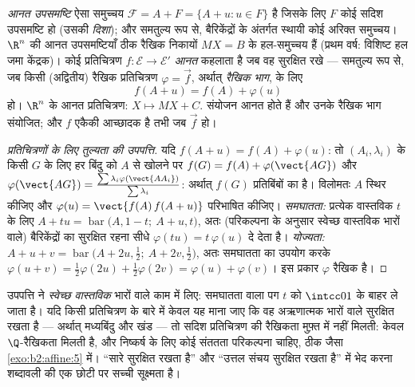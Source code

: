 \begin{definition}\label{def:b2:affine:subspace}
\emph{आनत उपसमष्टि} ऐसा समुच्चय $\mathcal{F} = A + F = \{A + u :
u \in F\}$ है जिसके लिए $F$ कोई सदिश उपसमष्टि हो
(उसकी \emph{दिशा}); और समतुल्य रूप से, बैरिकेंद्रों के अंतर्गत स्थायी कोई
अरिक्त समुच्चय। $\R^n$ की आनत उपसमष्टियाँ ठीक रैखिक निकायों $MX = B$ के हल-समुच्चय
हैं (प्रथम वर्ष: विशिष्ट हल जमा केंद्रक)। कोई प्रतिचित्रण $f \colon
\mathcal{E} \to \mathcal{E}'$
\emph{आनत} कहलाता है जब वह  सुरक्षित रखे
--- समतुल्य रूप से, जब किसी (अद्वितीय) रैखिक प्रतिचित्रण $\varphi = \vec f$, अर्थात्
\emph{रैखिक भाग}, के लिए
\[
f(A + u) = f(A) + \varphi(u)
\]
हो। $\R^n$ के आनत प्रतिचित्रण: $X \mapsto MX + C$. संयोजन आनत होते हैं और उनके रैखिक भाग
संयोजित; और $f$ एकैकी आच्छादक है तभी जब $\vec f$ हो।
\end{definition}

\begin{proof}[प्रतिचित्रणों के लिए तुल्यता की उपपत्ति]
यदि $f(A + u) = f(A) + \varphi(u)$: तो $(A_i,
\lambda_i)$ के किसी  $G$ के लिए हर बिंदु को $A$ से खोलने पर
$f(G) = f(A) +
\varphi(\vect{AG})$ और $\varphi(\vect{AG}) =
\frac{\sum\lambda_i\varphi(\vect{AA_i})}{\sum\lambda_i}$: अर्थात् $f(G)$ प्रतिबिंबों का  है। विलोमतः $A$ स्थिर
कीजिए और $\varphi(u) = \vect{f(A)\,f(A + u)}$ परिभाषित कीजिए। \emph{समघातता:} प्रत्येक वास्तविक $t$ के लिए
$A + tu =
\operatorname{bar}\bigl(A, 1-t;\ A + u, t\bigr)$, अतः (परिकल्पना के अनुसार स्वेच्छ वास्तविक भारों वाले) बैरिकेंद्रों का
सुरक्षित रहना सीधे $\varphi(tu) = t\,\varphi(u)$ दे देता है। \emph{योज्यता:} $A + u + v = \operatorname{bar}\bigl(A + 2u,
\tfrac12;\ A + 2v, \tfrac12\bigr)$, अतः समघातता का
उपयोग करके $\varphi(u + v) =
\tfrac12\varphi(2u) + \tfrac12\varphi(2v) = \varphi(u) +
\varphi(v)$। इस प्रकार $\varphi$ रैखिक है।
\end{proof}

\begin{remark}
उपपत्ति ने \emph{स्वेच्छ वास्तविक} भारों वाले  काम में लिए:
समघातता वाला पग $t$ को $\intcc01$ के बाहर ले जाता है। यदि किसी प्रतिचित्रण के बारे
में केवल यह माना जाए कि वह अऋणात्मक भारों वाले  सुरक्षित रखता है
--- अर्थात् मध्यबिंदु और खंड --- तो सदिश प्रतिचित्रण की रैखिकता मुफ़्त में
नहीं मिलती: केवल $\Q$-रैखिकता मिलती है, और निष्कर्ष के लिए कोई संततता
परिकल्पना चाहिए, ठीक जैसा \cref{exo:b2:affine:5} में। ``सारे  सुरक्षित रखता है''
और ``उत्तल संचय सुरक्षित रखता है'' में भेद करना  शब्दावली की एक छोटी पर
सच्ची सूक्ष्मता है।
\end{remark}

